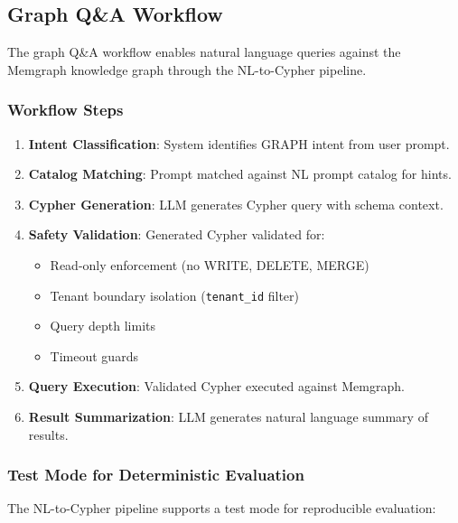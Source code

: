 \subsection{Graph Q\&A Workflow}

The graph Q\&A workflow enables natural language queries against the Memgraph knowledge graph through the NL-to-Cypher pipeline.

\subsubsection{Workflow Steps}

\begin{enumerate}
    \item \textbf{Intent Classification}: System identifies GRAPH intent from user prompt.
    
    \item \textbf{Catalog Matching}: Prompt matched against NL prompt catalog for hints.
    
    \item \textbf{Cypher Generation}: LLM generates Cypher query with schema context.
    
    \item \textbf{Safety Validation}: Generated Cypher validated for:
    \begin{itemize}
        \item Read-only enforcement (no WRITE, DELETE, MERGE)
        \item Tenant boundary isolation (\texttt{tenant\_id} filter)
        \item Query depth limits
        \item Timeout guards
    \end{itemize}
    
    \item \textbf{Query Execution}: Validated Cypher executed against Memgraph.
    
    \item \textbf{Result Summarization}: LLM generates natural language summary of results.
\end{enumerate}

\subsubsection{Test Mode for Deterministic Evaluation}

The NL-to-Cypher pipeline supports a test mode for reproducible evaluation:

